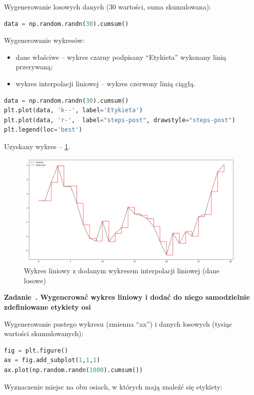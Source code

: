 \documentclass[11pt]{report}
\newcounter{zadanie}
\newcommand{\zadanie}[1]{
    \refstepcounter{zadanie}
    \filbreak\vspace*{1cm}
    {\noindent\raggedright\Large \textbf{Zadanie~\thezadanie. #1}}
    \vspace{10 pt}\nopagebreak[1]
}
\begin{document}
Wygenerowanie losowych danych (30 wartości, suma skumulowana):

\begin{lstlisting}[language=Python]
data = np.random.randn(30).cumsum()
\end{lstlisting}

Wygenerowanie wykresów:

\begin{itemize}
    \item dane właściwe -- wykres czarny podpisany \enquote{Etykieta} wykonany linią przerywaną;
    \item wykres interpolacji liniowej -- wykres czerwony linią ciągłą.
\end{itemize}

\begin{lstlisting}[language=Python]
data = np.random.randn(30).cumsum()
plt.plot(data, 'k--', label='Etykieta')
plt.plot(data, 'r-',  label="steps-post", drawstyle="steps-post")
plt.legend(loc='best')
\end{lstlisting}

Uzyskany wykres -- \ref{fig:wykres5}.

\begin{figure}[h]
    \caption{Wykres liniowy z dodanym wykresem interpolacji liniowej (dane losowe)}
    \label{fig:wykres5}
    \centering
    \includegraphics[width=.8\textwidth]{wykres5}
\end{figure}

\zadanie{Wygenerować wykres liniowy i dodać do niego samodzielnie zdefiniowane etykiety osi}

Wygenerowanie pustego wykresu (zmienna \enquote{ax}) i danych losowych (tysiąc wartości skumulowanych):

\begin{lstlisting}[language=Python]
fig = plt.figure()
ax = fig.add_subplot(1,1,1)
ax.plot(np.random.randn(1000).cumsum())
\end{lstlisting}

Wyznaczenie miejsc na obu osiach, w których mają znaleźć się etykiety:
\end{document}
